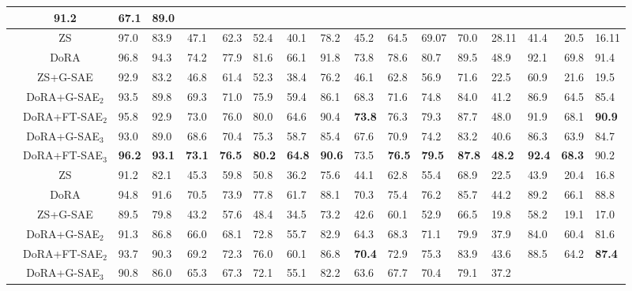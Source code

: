 \begin{table}[!htbp]
{\begin{tabular}{lc A B C D E F G H I J K L M N O}
    & \bf91.2 & \bf67.1 & 89.0 \\
\midrule
  & ZS
    & 97.0 & 83.9 & 47.1 & 62.3 & 52.4 & 40.1
    & 78.2 & 45.2 & 64.5 & 69.07 & 70.0 & 28.11
    & 41.4 & 20.5 & 16.11 \\
  & DoRA
    & 96.8 & 94.3 & 74.2 & 77.9 & 81.6 & 66.1
    & 91.8 & 73.8 & 78.6 & 80.7 & 89.5 & 48.9
    & 92.1 & 69.8 & 91.4 \\
  \cmidrule(l){2-17}
  & ZS+G-SAE
    & 92.9 & 83.2 & 46.8 & 61.4 & 52.3 & 38.4
    & 76.2 & 46.1 & 62.8 & 56.9 & 71.6 & 22.5
    & 60.9 & 21.6 & 19.5 \\
  & DoRA+G-SAE$_2$
    & 93.5 & 89.8 & 69.3 & 71.0 & 75.9 & 59.4
    & 86.1 & 68.3 & 71.6 & 74.8 & 84.0 & 41.2
    & 86.9 & 64.5 & 85.4 \\
  & DoRA+FT-SAE$_2$
    & 95.8 & 92.9 & 73.0 & 76.0 & 80.0 & 64.6
    & 90.4 & \bf73.8 & 76.3 & 79.3 & 87.7 & 48.0
    & 91.9 & 68.1 & \bf90.9 \\
  & DoRA+G-SAE$_3$
    & 93.0 & 89.0 & 68.6 & 70.4 & 75.3 & 58.7
    & 85.4 & 67.6 & 70.9 & 74.2 & 83.2 & 40.6
    & 86.3 & 63.9 & 84.7 \\
  & DoRA+FT-SAE$_3$
    & \bf96.2 & \bf93.1 & \bf73.1 & \bf76.5 & \bf80.2 & \bf64.8
    & \bf90.6 & 73.5 & \bf76.5 & \bf79.5 & \bf87.8 & \bf48.2
    & \bf92.4 & \bf68.3 & 90.2 \\
\midrule
  & ZS
    & 91.2 & 82.1 & 45.3 & 59.8 & 50.8 & 36.2
    & 75.6 & 44.1 & 62.8 & 55.4 & 68.9 & 22.5
    & 43.9 & 20.4 & 16.8 \\
  & DoRA
    & 94.8 & 91.6 & 70.5 & 73.9 & 77.8 & 61.7
    & 88.1 & 70.3 & 75.4 & 76.2 & 85.7 & 44.2
    & 89.2 & 66.1 & 88.8 \\
  \cmidrule(l){2-17}
  & ZS+G-SAE
    & 89.5 & 79.8 & 43.2 & 57.6 & 48.4 & 34.5
    & 73.2 & 42.6 & 60.1 & 52.9 & 66.5 & 19.8
    & 58.2 & 19.1 & 17.0 \\
  & DoRA+G-SAE$_2$
    & 91.3 & 86.8 & 66.0 & 68.1 & 72.8 & 55.7
    & 82.9 & 64.3 & 68.3 & 71.1 & 79.9 & 37.9
    & 84.0 & 60.4 & 81.6 \\
  & DoRA+FT-SAE$_2$
    & 93.7 & 90.3 & 69.2 & 72.3 & 76.0 & 60.1
    & 86.8 & \bf70.4 & 72.9 & 75.3 & 83.9 & 43.6
    & 88.5 & 64.2 & \bf87.4 \\
  & DoRA+G-SAE$_3$
    & 90.8 & 86.0 & 65.3 & 67.3 & 72.1 & 55.1
    & 82.2 & 63.6 & 67.7 & 70.4 & 79.1 & 37.2

\end{tabular}}
\end{table}
